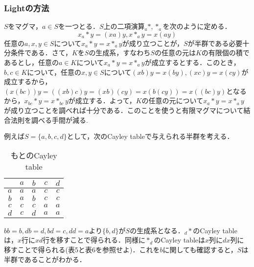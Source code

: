 \documentclass{jsarticle}
\begin{document}
\subsubsection{Lightの方法}
$S$をマグマ，$a\in S$を一つとる．$S$上の二項演算$_{a}*,*_{a}$を次のように定める．
$$
x_{a}*y=(xa)y, x*_{a}y=x(ay)
$$
任意の$a,x,y\in S$について$x_{a}*y=x*_{a}y$が成り立つことが，$S$が半群である必要十分条件である．さて，$K$を$S$の生成系，すなわち$S$の任意の元は$K$の有限個の積であるとし，任意の$a\in K$について$x_{a}*y=x*_{a}y$が成立するとする．このとき，$b,c\in K$について，任意の$x,y\in S$について$(xb)y=x(by), (xc)y=x(cy)$が成立するから，$(x(bc))y=((xb)c)y=(xb)(cy)=x(b(cy))=x((bc)y)$となるから，$x_{bc}*y=x*_{bc}y$が成立する．よって，$K$の任意の元について$x_{a}*y=x*_{a}y$が成り立つことを調べれば十分である．このことを使うと有限マグマについて結合法則を調べる手間が減る.
\par
例えば$S=\{a,b,c,d\}$として，次のCayley tableで与えられる半群を考える．
\begin{table}[htb]
\begin{center}
\begin{tabular}{c|cccc}
     &$a$&$b$&$c$&$d$ \\ \hline
$a$&$a$&$a$&$c$&$c$ \\
$b$&$a$&$b$&$c$&$c$ \\
$c$&$c$&$c$&$a$&$a$ \\
$d$&$c$&$d$&$a$&$a$  
\end{tabular}
\caption{もとのCayley table}
\end{center}
\end{table}
$bb=b,db=d,bd=c,dd=a$より$\{b,d\}$が$S$の生成系となる．$_{d}*$のCayley tableは，$x$行に$xd$行を移すことで得られる．同様に$*_{d}$のCayley tableは$x$列に$dx$列に移すことで得られる(表5と表6を参照せよ)．これを$b$に関しても確認すると，$S$は半群であることがわかる．
\end{document}
